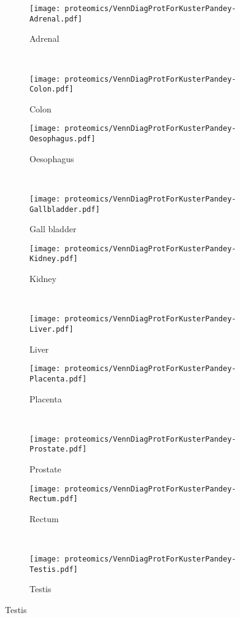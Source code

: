 \begin{figure}[!htbp]
    \centering
    \begin{subfigure}[b]{.5\textwidth}
        \centering \texttt{[image: proteomics/VennDiagProtForKusterPandey-Adrenal.pdf]}
        \caption{Adrenal}\label{fig:prot3Dadrenal}
    \end{subfigure}~%
    \begin{subfigure}[b]{.5\textwidth}
        \centering \texttt{[image: proteomics/VennDiagProtForKusterPandey-Colon.pdf]}
        \caption{Colon}\label{fig:prot3Dcolon}
    \end{subfigure}

    \begin{subfigure}[b]{.5\textwidth}
        \centering \texttt{[image: proteomics/VennDiagProtForKusterPandey-Oesophagus.pdf]}
        \caption{Oesophagus}\label{fig:prot3Doesophagus}
    \end{subfigure}~%
    \begin{subfigure}[b]{.5\textwidth}
        \centering \texttt{[image: proteomics/VennDiagProtForKusterPandey-Gallbladder.pdf]}
        \caption{Gall bladder}\label{fig:prot3Dgallbladder}
    \end{subfigure}

    \begin{subfigure}[b]{.5\textwidth}
        \centering \texttt{[image: proteomics/VennDiagProtForKusterPandey-Kidney.pdf]}
        \caption{Kidney}\label{fig:prot3Dkidney}
    \end{subfigure}~%
    \begin{subfigure}[b]{.5\textwidth}
        \centering \texttt{[image: proteomics/VennDiagProtForKusterPandey-Liver.pdf]}
        \caption{Liver}\label{fig:prot3Dliver}
    \end{subfigure}

    \begin{subfigure}[b]{.5\textwidth}
        \centering \texttt{[image: proteomics/VennDiagProtForKusterPandey-Placenta.pdf]}
        \caption{Placenta}\label{fig:prot3Dplacenta}
    \end{subfigure}~%
    \begin{subfigure}[b]{.5\textwidth}
        \centering \texttt{[image: proteomics/VennDiagProtForKusterPandey-Prostate.pdf]}
        \caption{Prostate}\label{fig:prot3Dprostate}
    \end{subfigure}

    \begin{subfigure}[b]{.5\textwidth}
        \centering \texttt{[image: proteomics/VennDiagProtForKusterPandey-Rectum.pdf]}
        \caption{Rectum}\label{fig:prot3Drectum}
    \end{subfigure}~%
    \begin{subfigure}[b]{.5\textwidth}
        \centering \texttt{[image: proteomics/VennDiagProtForKusterPandey-Testis.pdf]}
        \caption{Testis}\label{fig:prot3Dtestis}
    \end{subfigure}


\end{figure}
